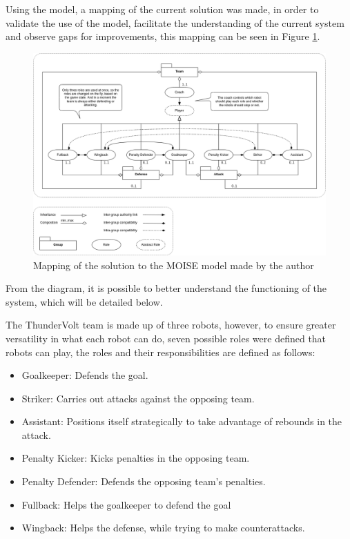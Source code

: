 Using the \MOISEp \cite{MOISEp} model, a mapping of the current solution was made, in order to validate the use of the model, facilitate the understanding of the current system and observe gaps for improvements, this mapping can be seen in Figure \ref{fig:moise_mapping}.

\begin{figure}[!ht]
    \centering
    \includegraphics[width=\linewidth]{images/ThunderVolt Moise-Structural Specification.png}
    \caption{Mapping of the solution to the MOISE model made by the author}
    \label{fig:moise_mapping}
\end{figure}

From the diagram, it is possible to better understand the functioning of the system, which will be detailed below.

The ThunderVolt team is made up of three robots, however, to ensure greater versatility in what each robot can do, seven possible roles were defined that robots can play, the roles and their responsibilities are defined as follows:

\begin{itemize}
    \item Goalkeeper: Defends the goal.
    \item Striker: Carries out attacks against the opposing team.
    \item Assistant: Positions itself strategically to take advantage of rebounds in the attack.
    \item Penalty Kicker: Kicks penalties in the opposing team.
    \item Penalty Defender: Defends the opposing team's penalties.
    \item Fullback: Helps the goalkeeper to defend the goal
    \item Wingback: Helps the defense, while trying to make counterattacks.
\end{itemize}

